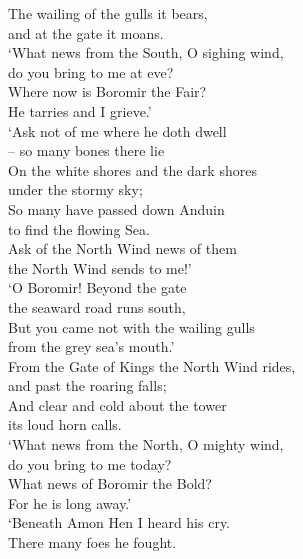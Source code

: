 The wailing of the gulls it bears, \tab{}\\
and at the gate it moans. \tab{}\tab{}\\
‘What news from the South, O sighing wind, \tab{}\\
do you bring to me at eve? \tab{}\tab{}\\
Where now is Boromir the Fair? \tab{}\\
He tarries and I grieve.’ \tab{}\tab{}\\
\hop
‘Ask not of me where he doth dwell \\
 – so many bones there lie \tab{}\\
On the white shores and the dark shores \\
under the stormy sky; \tab{}\\
So many have passed down Anduin \\
to find the flowing Sea. \tab{}\\
Ask of the North Wind news of them \\
the North Wind sends to me!’ \tab{}\\
\hop
{} ‘O Boromir! Beyond the gate \\
 the seaward road runs south, \\ 
 But you came not with the wailing gulls \\
 from the grey sea’s mouth.’ \\
\hops
From the Gate of Kings the North Wind rides, \\
and past the roaring falls; \tab{}\tab{}\\
And clear and cold about the tower \tab{}\\
its loud horn calls. \tab{}\tab{}\\
‘What news from the North, O mighty wind, \tab{}\\
do you bring to me today? \tab{}\tab{}\\
What news of Boromir the Bold? \tab{}\\
For he is long away.’ \tab{}\tab{}\\
\hop
‘Beneath Amon Hen I heard his cry. \\
There many foes he fought. \tab{}\\
